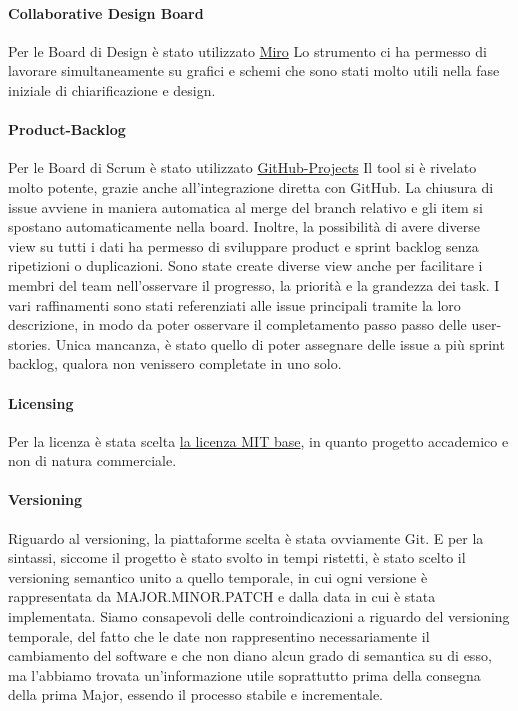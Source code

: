     \paragraph{Collaborative Design Board}
    Per le Board di Design è stato utilizzato \href{https://miro.com/app/board/uXjVPN93uLs=/?share_link_id=56431555728}{Miro} Lo strumento ci ha permesso di lavorare simultaneamente su grafici e schemi che sono stati molto utili nella fase iniziale di chiarificazione e design. 

    \paragraph{Product-Backlog}
    Per le Board di Scrum è stato utilizzato \href{https://github.com/orgs/ISIQuiz/projects/3}{GitHub-Projects} Il tool si è rivelato molto potente, grazie anche all'integrazione diretta con GitHub. La chiusura di issue avviene in maniera automatica al merge del branch relativo e gli item si spostano automaticamente nella board. Inoltre, la possibilità di avere diverse view su tutti i dati ha permesso di sviluppare product e sprint backlog senza ripetizioni o duplicazioni. Sono state create diverse view anche per facilitare i membri del team nell'osservare il progresso, la priorità e la grandezza dei task. I vari raffinamenti sono stati referenziati alle issue principali tramite la loro descrizione, in modo da poter osservare il completamento passo passo delle user-stories. Unica mancanza, è stato quello di poter assegnare delle issue a più sprint backlog, qualora non venissero completate in uno solo. 
    
    \paragraph{Licensing} 
    Per la licenza è stata scelta \href{https://choosealicense.com/licenses/}{la licenza MIT base}, in quanto progetto accademico e non di natura commerciale.
    
    \paragraph{Versioning}
    Riguardo al versioning, la piattaforme scelta è stata ovviamente Git. E per la sintassi, siccome il progetto è stato svolto in tempi ristetti, è stato scelto il versioning semantico unito a quello temporale, in cui ogni versione è rappresentata da MAJOR.MINOR.PATCH e dalla data in cui è stata implementata. Siamo consapevoli delle controindicazioni a riguardo del versioning temporale, del fatto che le date non rappresentino necessariamente il cambiamento del software e che non diano alcun grado di semantica su di esso, ma l'abbiamo trovata un'informazione utile soprattutto prima della consegna della prima Major, essendo il processo stabile e incrementale.
    
